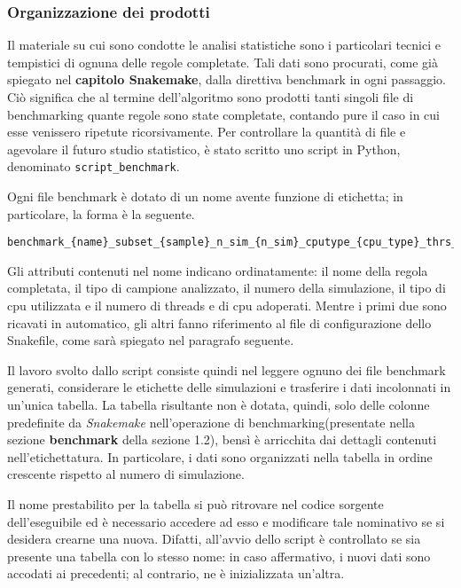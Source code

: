 \subsubsection{Organizzazione dei prodotti}
Il materiale su cui sono condotte le analisi statistiche sono i particolari tecnici e tempistici di ognuna delle regole completate.
Tali dati sono procurati, come già spiegato nel \textbf{capitolo Snakemake}, dalla direttiva benchmark in ogni passaggio.
Ciò significa che al termine dell'algoritmo sono prodotti tanti singoli file di benchmarking quante regole sono state completate, contando pure il caso in cui esse venissero ripetute ricorsivamente.
Per controllare la quantità di file e agevolare il futuro studio statistico, è stato scritto uno script in Python, denominato \verb!script_benchmark!.


Ogni file benchmark è dotato di un nome avente funzione di etichetta; in particolare, la forma è la seguente.
\begin{lstlisting}
benchmark_{name}_subset_{sample}_n_sim_{n_sim}_cputype_{cpu_type}_thrs_{thrs}_ncpu{n_cpu}.txt
\end{lstlisting}
Gli attributi contenuti nel nome indicano ordinatamente: il nome della regola completata, il tipo di campione analizzato, il numero della simulazione, il tipo di cpu utilizzata e il numero di threads e di cpu adoperati.
Mentre i primi due sono ricavati in automatico, gli altri fanno riferimento al file di configurazione dello Snakefile, come sarà spiegato nel paragrafo seguente.

Il lavoro svolto dallo script consiste quindi nel leggere ognuno dei file benchmark generati, considerare le etichette delle simulazioni e trasferire i dati incolonnati in un'unica tabella.
La tabella risultante non è dotata, quindi, solo delle colonne predefinite da \textit{Snakemake} nell'operazione di benchmarking(presentate nella sezione \textbf{benchmark} della sezione 1.2), bensì è arricchita dai dettagli contenuti nell'etichettatura.
In particolare, i dati sono organizzati nella tabella in ordine crescente rispetto al numero di simulazione.

Il nome prestabilito per la tabella si può ritrovare nel codice sorgente dell'eseguibile ed è necessario accedere ad esso e modificare tale nominativo se si desidera crearne una nuova.
Difatti, all'avvio dello script è controllato se sia presente una tabella con lo stesso nome: in caso affermativo, i nuovi dati sono accodati ai precedenti; al contrario, ne è inizializzata un'altra.

